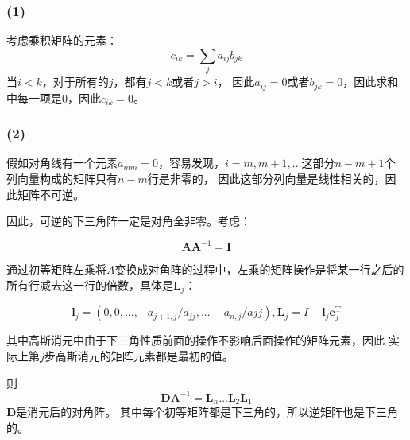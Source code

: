 \documentclass[UTF8,zihao=5]{ctexart}
\newcommand{\bm}[1]{{\mathbf{#1}}}
\newcommand{\trans}[0]{^\mathrm{T}}
\begin{document}
\subsubsection*{(1)}
考虑乘积矩阵的元素：
$$
c_{ik}=\sum_{j}a_{ij}b_{jk}
$$
当$i<k$，对于所有的$j$，都有$j<k$或者$j>i$，
因此$a_{ij}=0$或者$b_{jk}=0$，因此求和中每一项是0，因此$c_{ik}=0$。

\subsubsection*{(2)}
假如对角线有一个元素$a_{mm}=0$，容易发现，$i=m,m+1,...$这部分$n-m+1$个
列向量构成的矩阵只有$n-m$行是非零的，
因此这部分列向量是线性相关的，因此矩阵不可逆。

因此，可逆的下三角阵一定是对角全非零。考虑：

$$
\bm{A}\bm{A}^{-1}=\bm{I}
$$

通过初等矩阵左乘将$A$变换成对角阵的过程中，左乘的矩阵操作是将某一行之后的
所有行减去这一行的倍数，具体是$\bm{L}_j$：

$$
\bm{l}_j=(0,0,...,-a_{j+1,j}/a_{jj},...-a_{n,j}/a{jj}),
\bm{L}_j=I+\bm{l}_j\bm{e}_j\trans
$$

其中高斯消元中由于下三角性质前面的操作不影响后面操作的矩阵元素，因此
实际上第$j$步高斯消元的矩阵元素都是最初的值。

则
$$
\bm{D}\bm{A}^{-1} = \bm{L}_n\dots\bm{L}_2\bm{L}_1
$$
$\bm{D}$是消元后的对角阵。
其中每个初等矩阵都是下三角的，所以逆矩阵也是下三角的。










\end{document}
